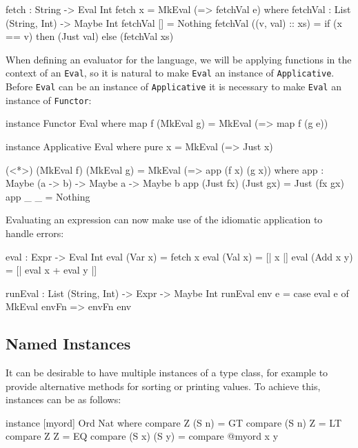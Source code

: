 \begin{code}
fetch : String -> Eval Int
fetch x = MkEval (\e => fetchVal e) where
    fetchVal : List (String, Int) -> Maybe Int
    fetchVal [] = Nothing
    fetchVal ((v, val) :: xs) = if (x == v)
                                  then (Just val)
                                  else (fetchVal xs)
\end{code} 
  
\noindent
When defining an evaluator for the language, we will be applying functions in the context of an \texttt{Eval}, so it is natural to make \texttt{Eval} an instance of \texttt{Applicative}.
Before \texttt{Eval} can be an instance of \texttt{Applicative} it is necessary to make \texttt{Eval} an instance of \texttt{Functor}:

\begin{code}
instance Functor Eval where
    map f (MkEval g) = MkEval (\e => map f (g e))

instance Applicative Eval where
    pure x = MkEval (\e => Just x)

    (<*>) (MkEval f) (MkEval g) = MkEval (\x => app (f x) (g x)) where
        app : Maybe (a -> b) -> Maybe a -> Maybe b
        app (Just fx) (Just gx) = Just (fx gx)
        app _         _         = Nothing
\end{code}

\noindent
Evaluating an expression can now make use of the idiomatic application to handle errors:

\begin{code}
eval : Expr -> Eval Int
eval (Var x)   = fetch x
eval (Val x)   = [| x |]
eval (Add x y) = [| eval x + eval y |]
  
runEval : List (String, Int) -> Expr -> Maybe Int
runEval env e = case eval e of
    MkEval envFn => envFn env
\end{code} 

\subsection{Named Instances}

It can be desirable to have multiple instances of a type class, for example to provide alternative methods for sorting or printing values.
To achieve this, instances can be  as follows:

\begin{code}
instance [myord] Ord Nat where
   compare Z (S n)     = GT
   compare (S n) Z     = LT
   compare Z Z         = EQ
   compare (S x) (S y) = compare @{myord} x y
\end{code}

